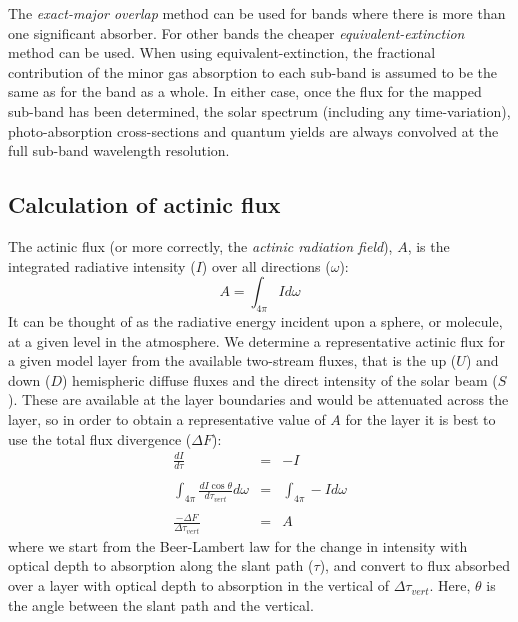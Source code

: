 The {\em exact-major overlap} method can be used for bands where there is more than one significant absorber. For other bands the cheaper {\em equivalent-extinction} method can be used. When using equivalent-extinction, the fractional contribution of the minor gas absorption to each sub-band is assumed to be the same as for the band as a whole. In either case, once the flux for the mapped sub-band has been determined, the solar spectrum (including any time-variation), photo-absorption cross-sections and quantum yields are always convolved at the full sub-band wavelength resolution.

\subsection{Calculation of actinic flux}
The actinic flux (or more correctly, the {\em actinic radiation field}), $A$, is the integrated radiative intensity ($I$) over all directions ($\omega$):
\begin{equation}
A = \int_{4\pi}I d\omega
\end{equation}
It can be thought of as the radiative energy incident upon a sphere, or molecule, at a given level in the atmosphere. We determine a representative actinic flux for a given model layer from the available two-stream fluxes, that is the up ($U$) and down ($D$) hemispheric diffuse fluxes and the direct intensity of the solar beam ($S$). These are available at the layer boundaries and would be attenuated across the layer, so in order to obtain a representative value of $A$ for the layer it is best to use the total flux divergence ($\Delta F$):
\begin{eqnarray}
\frac{dI}{d\tau} & = & -I \\
&& \nonumber \\
\int_{4\pi}\frac{dI \cos{\theta}}{d\tau_{vert}}d\omega & = & \int_{4\pi}-I d\omega \\
&& \nonumber \\
\frac{-\Delta F}{\Delta \tau_{vert}} & = & A \label{eqn:A_flux-div}
\end{eqnarray}
where we start from the Beer-Lambert law for the change in intensity with optical depth to absorption along the slant path ($\tau$), and convert to flux absorbed over a layer with optical depth to absorption in the vertical of $\Delta \tau_{vert}$. Here, $\theta$ is the angle between the slant path and the vertical.

